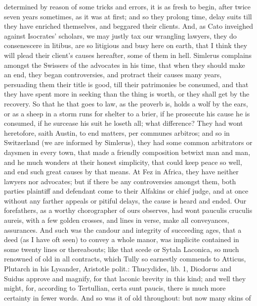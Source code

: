 {determined by reason of some tricks and errors, it is as fresh to
begin, after twice seven years sometimes, as it was at first; and so
they prolong time, delay suits till they have enriched themselves, and
beggared their clients. And, as Cato inveighed against Isocrates'
scholars, we may justly tax our wrangling lawyers, they do consenescere
in litibus, are so litigious and busy here on earth, that I think they
will plead their client's causes hereafter, some of them in hell. 
Simlerus complains amongst the Swissers of the advocates in his time,
that when they should make an end, they began controversies, and
protract their causes many years, persuading them their title is good,
till their patrimonies be consumed, and that they have spent more in
seeking than the thing is worth, or they shall get by the recovery. So
that he that goes to law, as the proverb is, holds a wolf by the
ears, or as a sheep in a storm runs for shelter to a brier, if he
prosecute his cause he is consumed, if he surcease his suit he loseth
all; what difference? They had wont heretofore, saith Austin, to
end matters, per communes arbitros; and so in Switzerland (we are
informed by Simlerus), they had some common arbitrators or daysmen
in every town, that made a friendly composition betwixt man and man,
and he much wonders at their honest simplicity, that could keep peace
so well, and end such great causes by that means. At Fez in
Africa, they have neither lawyers nor advocates; but if there be any
controversies amongst them, both parties plaintiff and defendant come
to their Alfakins or chief judge, and at once without any farther
appeals or pitiful delays, the cause is heard and ended. Our
forefathers, as a worthy chorographer of ours observes, had wont
pauculis cruculis aureis, with a few golden crosses, and lines in
verse, make all conveyances, assurances. And such was the candour and
integrity of succeeding ages, that a deed (as I have oft seen) to
convey a whole manor, was implicite contained in some twenty lines or
thereabouts; like that scede or Sytala Laconica, so much renowned of
old in all contracts, which Tully so earnestly commends to
Atticus, Plutarch in his Lysander, Aristotle polit.: Thucydides, lib.
1, Diodorus and Suidus approve and magnify, for that laconic
brevity in this kind; and well they might, for, according to
Tertullian, certa sunt paucis, there is much more certainty in
fewer words. And so was it of old throughout: but now many skins of
}
